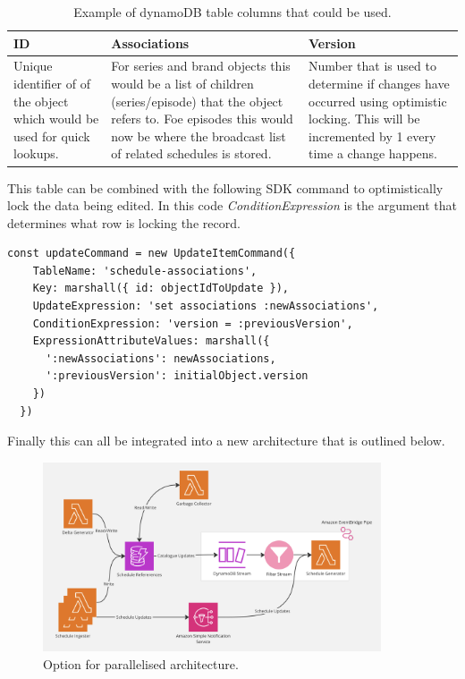 \begin{table}[H]
  \centering
  \begin{tabular}{|p{}|p{}|p{}|}
    \hline
    ID & Associations & Version \\ \hline
    Unique identifier of of the object which would be used for quick lookups. 
    & For series and brand objects this would be a list of children (series/episode) that the object refers to. Foe episodes this would now be 
    where the broadcast list of related schedules is stored.
    & Number that is used to determine if changes have occurred using optimistic locking. This will be incremented by 1 every time a change happens. \\ \hline
  \end{tabular}
  \caption{Example of dynamoDB table columns that could be used.}
\end{table}

This table can be combined with the following SDK command to optimistically lock the data being edited. In this code \emph{ConditionExpression} is 
the argument that determines what row is locking the record.

\begin{lstlisting}[caption=SDK command sent to optimistically lock writes to the assocaitions column.]
  const updateCommand = new UpdateItemCommand({
    TableName: 'schedule-associations',
    Key: marshall({ id: objectIdToUpdate }),
    UpdateExpression: 'set associations :newAssociations',
    ConditionExpression: 'version = :previousVersion',
    ExpressionAttributeValues: marshall({ 
      ':newAssociations': newAssociations,
      ':previousVersion': initialObject.version 
    })
  })
  \end{lstlisting}

  Finally this can all be integrated into a new architecture that is outlined below.

  \begin{figure}[H]
    \centering
    \includegraphics[width=10cm]{assets/architectures/dynamo.png}
    \caption{Option for parallelised architecture.}
    \label{fig:dynamoArchitecture}
  \end{figure}

